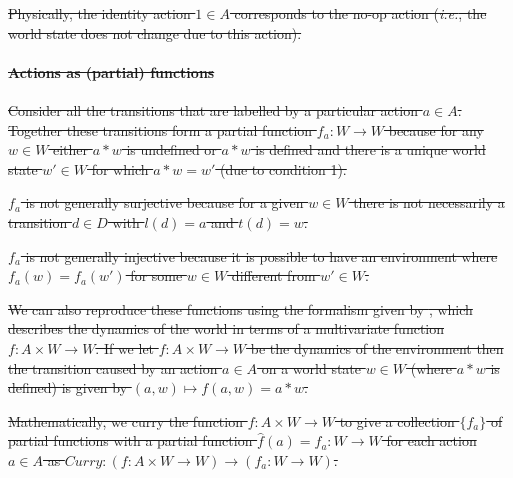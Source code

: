 \sout{
Physically, the identity action $1 \in A$ corresponds to the no-op action (\textit{i.e.}, the world state does not change due to this action).
}

\paragraph{\sout{Actions as (partial) functions}}
\sout{
Consider all the transitions that are labelled by a particular action $a \in A$.
Together these transitions form a partial function $f_{a}: W \to W$ because for any $w \in W$ either $a * w$ is undefined or $a * w$ is defined and there is a unique world state $w' \in W$ for which $a * w = w'$ (due to condition 1).
}

\sout{
$f_{a}$ is not generally surjective because for a given $w \in W$ there is not necessarily a transition $d \in D$ with $l(d) = a$ and $t(d) = w$.
}

\sout{
$f_{a}$ is not generally injective because it is possible to have an environment where $f_{a}(w)=f_{a}(w')$ for some $w \in W$ different from $w' \in W$.
}

\sout{
We can also reproduce these functions using the formalism given by \autocite{caselles2019symmetry}, which describes the dynamics of the world in terms of a multivariate function $f: A \times W \to W$.
If we let $f: A \times W \to W$ be the dynamics of the environment then the transition caused by an action $a \in A$ on a world state $w \in W$ (where $a * w$ is defined) is given by $(a,w) \mapsto f(a,w) = a * w$.
}

\sout{
Mathematically, we curry the function $f: A \times W \to W$ to give a collection $\{f_{a}\}$ of partial functions with a partial function $\hat{f}(a)=f_{a}: W \to W$ for each action $a \in A$ as $\textit{Curry}: (f: A \times W \to W) \to (f_{a}: W \to W)$.
}